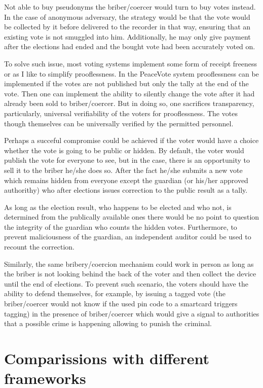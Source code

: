 \documentclass[12pt,a4paper]{article}
\let\Oldsection\section
\renewcommand{\section}{\FloatBarrier\Oldsection}
\begin{document}
Not able to buy pseudonyms the briber/coercer would turn to buy votes instead. In the case of anonymous adversary, the strategy would be that the vote would be collected by it before delivered to the recorder in that way, ensuring that an existing vote is not smuggled into him. Additionally, he may only give payment after the elections had ended and the bought vote had been accurately voted on.\par
To solve such issue, most voting systems implement some form of receipt freeness or as I like to simplify prooflessness. In the PeaceVote system prooflessness can be implemented if the votes are not published but only the tally at the end of the vote. Then one can implement the ability to silently change the vote after it had already been sold to briber/coercer. But in doing so, one sacrifices transparency, particularly, universal verifiability of the voters for prooflessness. The votes though themselves can be universally verified by the permitted personnel.\par
Perhaps a succeful compromise could be achieved if the voter would have a choice whether the vote is going to be public or hidden. By default, the voter would publish the vote for everyone to see, but in the case, there is an opportunity to sell it to the briber he/she does so. After the fact he/she submits a new vote which remains hidden from everyone except the guardian (or his/her approved authorithy) who after elections issues correction to the public result as a tally.\par
As long as the election result, who happens to be elected and who not, is determined from the publically available ones there would be no point to question the integrity of the guardian who counts the hidden votes. Furthermore, to prevent maliciousness of the guardian, an independent auditor could be used to recount the correction.\par
Similarly, the same bribery/coercion mechanism could work in person as long as the briber is not looking behind the back of the voter and then collect the device until the end of elections. To prevent such scenario, the voters should have the ability to defend themselves, for example, by issuing a tagged vote (the briber/coercer would not know if the used pin code to a smartcard triggers tagging) in the presence of briber/coercer which would give a signal to authorities that a possible crime is happening allowing to punish the criminal.\par
\section{Comparissions with different frameworks}
\end{document}
